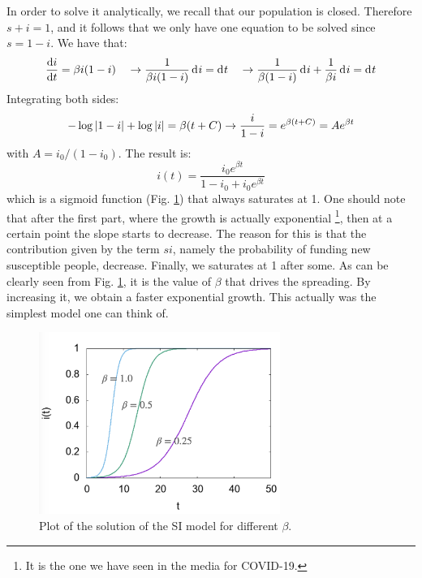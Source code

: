 \documentclass[../main/main.tex]{subfiles}
\begin{document}
In order to solve it analytically, we recall that our population is closed. Therefore $s+i=1$, and it follows that we only have one equation to be solved since $s=1-i$.
We have that:
\begin{equation*}
  \dv{i}{t} = \beta i (1-i) \quad \rightarrow \frac{1}{\beta i (1-i)} \dd[]{i} = \dd[]{t} \quad \rightarrow \frac{1}{\beta (1-i)} \dd[]{i} + \frac{1}{\beta i} \dd[]{i} = \dd[]{t}
\end{equation*}
Integrating both sides:
\begin{equation*}
  - \log \abs{1-i} + \log \abs{i} = \beta (t+C) \rightarrow \frac{i}{1-i} = e^{\beta (t+C)} = A e^{\beta t}
\end{equation*}
with \( A = i_0/(1-i_0) \).
The result is:
\begin{equation}
  i(t) = \frac{i_0 e^{\beta t} }{1-i_0 + i_0 e^{\beta t} }
\end{equation}
which is a sigmoid function (Fig. \ref{fig:3_2}) that always saturates at 1. One should note that after the first part, where the growth is actually exponential \footnote{It is the one we have seen in the media for COVID-19.}, then at a certain point the slope starts to decrease. The reason for this is that the contribution given by the term $s i$, namely the probability of funding new susceptible people, decrease. Finally, we saturates at 1 after some. As can be clearly seen from Fig. \ref{fig:3_2}, it is the value of $\beta$ that drives the spreading. By increasing it, we obtain a faster exponential growth.
This actually was the simplest model one can think of.

\begin{figure}[h!]
\centering
\includegraphics[width=0.7\textwidth]{../lessons/image/03/2.png}
\caption{\label{fig:3_2} Plot of the solution of the SI model for different \( \beta  \).}
\end{figure}
\end{document}
